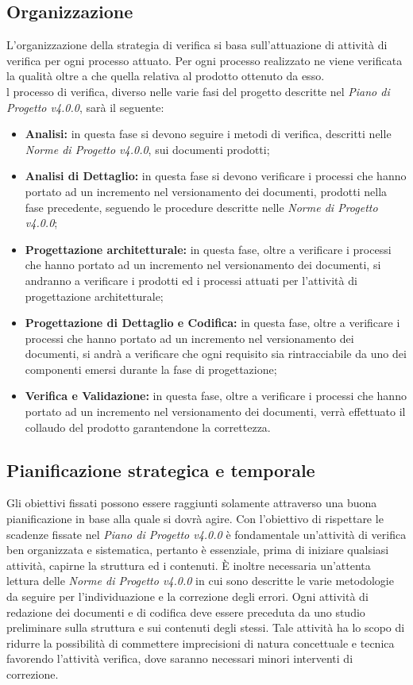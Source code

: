 \subsection{Organizzazione}
L'organizzazione della strategia di verifica si basa sull'attuazione di attività di verifica per ogni processo attuato. Per ogni processo realizzato ne viene verificata la qualità oltre a che quella relativa al prodotto ottenuto da esso.\\
l processo di verifica, diverso nelle varie fasi del progetto descritte nel \textit{Piano di Progetto v4.0.0}, sarà il seguente:
\begin{itemize}
	\item \textbf{Analisi:} in questa fase si devono seguire i metodi di verifica, descritti nelle \textit{Norme di Progetto v4.0.0}, sui documenti prodotti;
	\item \textbf{Analisi di Dettaglio:} in questa fase si devono verificare i processi che hanno portato ad un incremento nel \gls{versionamento} dei documenti, prodotti nella fase precedente, seguendo le procedure descritte nelle \textit{Norme di Progetto v4.0.0};
	\item \textbf{Progettazione architetturale:} in questa fase, oltre a verificare i processi che hanno portato ad un incremento nel \gls{versionamento} dei documenti, si andranno a verificare i prodotti ed i processi attuati per l'attività di progettazione architetturale;
	\item \textbf{Progettazione di Dettaglio e Codifica:} in questa fase, oltre a verificare i processi che hanno portato ad un incremento nel \gls{versionamento} dei documenti, si andrà a verificare che ogni requisito sia rintracciabile da uno dei componenti emersi durante la fase di progettazione;
	\item \textbf{Verifica e Validazione:} in questa fase, oltre a verificare i processi che hanno portato ad un incremento nel \gls{versionamento} dei documenti, verrà effettuato il collaudo del prodotto garantendone la correttezza.
\end{itemize} 

\subsection{Pianificazione strategica e temporale}
Gli obiettivi fissati possono essere raggiunti solamente attraverso una buona pianificazione in base alla quale si dovrà agire. Con l'obiettivo di rispettare le scadenze fissate nel \textit{Piano di Progetto v4.0.0} è fondamentale un'attività di verifica ben organizzata e sistematica, pertanto è essenziale, prima di iniziare qualsiasi attività, capirne la struttura ed i contenuti. È inoltre necessaria un'attenta lettura delle \textit{Norme di Progetto v4.0.0} in cui sono descritte le varie metodologie da seguire per l'individuazione e la correzione degli errori. Ogni attività di redazione dei documenti e di codifica deve essere preceduta da uno studio preliminare sulla struttura e sui contenuti degli stessi. Tale attività ha lo scopo di ridurre la possibilità di commettere imprecisioni di natura concettuale e tecnica favorendo l'attività verifica, dove saranno necessari minori interventi di correzione.

